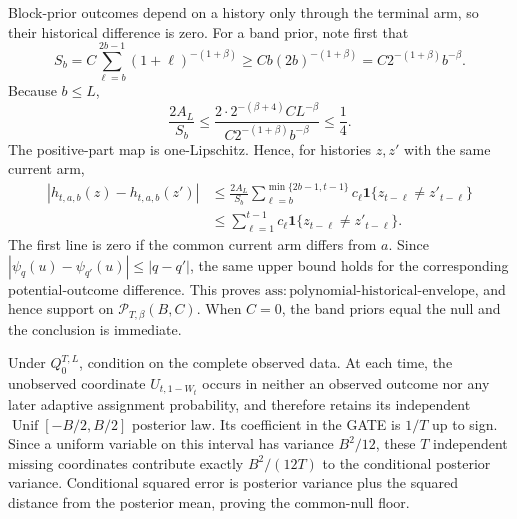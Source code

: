 Block-prior outcomes depend on a history only through the terminal arm, so their historical difference is zero.  For a band prior, note first that
\[
 S_b
 =C\sum_{\ell=b}^{2b-1}(1+\ell)^{-(1+\beta)}
 \ge Cb(2b)^{-(1+\beta)}
 =C2^{-(1+\beta)}b^{-\beta}.
\]
Because \(b\le L\),
\[
 \frac{2A_L}{S_b}
 \le
 \frac{2\cdot2^{-(\beta+4)}CL^{-\beta}}
 {C2^{-(1+\beta)}b^{-\beta}}
 \le\frac14.
\]
The positive-part map is one-Lipschitz.  Hence, for histories \(z,z'\) with the same current arm,
\[
 \begin{aligned}
 |h_{t,a,b}(z)-h_{t,a,b}(z')|
 &\le \frac{2A_L}{S_b}
 \sum_{\ell=b}^{\min\{2b-1,t-1\}}c_\ell
 \mathbf 1\{z_{t-\ell}\ne z'_{t-\ell}\}\\
 &\le \sum_{\ell=1}^{t-1}c_\ell
 \mathbf 1\{z_{t-\ell}\ne z'_{t-\ell}\}.
 \end{aligned}
\]
The first line is zero if the common current arm differs from \(a\).  Since \(|\psi_q(u)-\psi_{q'}(u)|\le|q-q'|\), the same upper bound holds for the corresponding potential-outcome difference.  This proves \(\mathrm{ass{:}polynomial\mbox{-}historical\mbox{-}envelope}\), and hence support on \(\mathcal P_{T,\beta}(B,C)\).  When \(C=0\), the band priors equal the null and the conclusion is immediate.

Under \(Q_0^{T,L}\), condition on the complete observed data.  At each time, the unobserved coordinate \(U_{t,1-W_t}\) occurs in neither an observed outcome nor any later adaptive assignment probability, and therefore retains its independent \(\operatorname{Unif}[-B/2,B/2]\) posterior law.  Its coefficient in the GATE is \(1/T\) up to sign.  Since a uniform variable on this interval has variance \(B^2/12\), these \(T\) independent missing coordinates contribute exactly \(B^2/(12T)\) to the conditional posterior variance.  Conditional squared error is posterior variance plus the squared distance from the posterior mean, proving the common-null floor.

